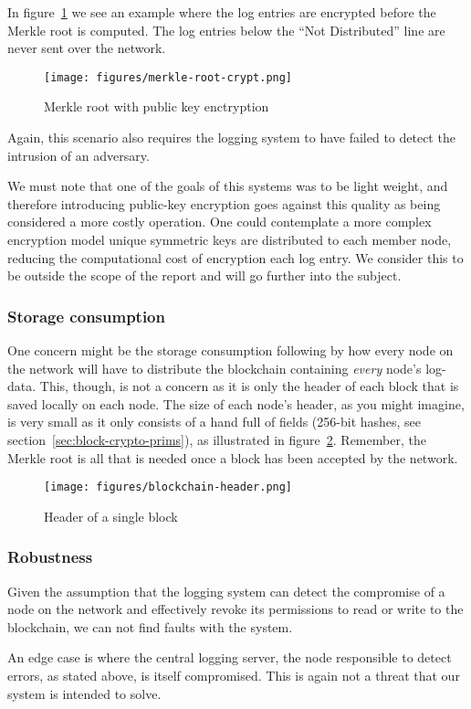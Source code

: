 In figure~\ref{fig:merkle-root-crypt} we see an example where the log
entries are encrypted before the Merkle root is computed. The log
entries below the ``Not Distributed'' line are never sent over the
network.

\begin{figure}
  \centering
  \texttt{[image: figures/merkle-root-crypt.png]}
  \caption{\label{fig:merkle-root-crypt} Merkle root with public key enctryption}
\end{figure}

Again, this scenario also requires the logging system to have failed
to detect the intrusion of an adversary.

We must note that one of the goals of this systems was to be light
weight, and therefore introducing public-key encryption goes against
this quality as being considered a more costly operation. One could
contemplate a more complex encryption model unique symmetric keys are
distributed to each member node, reducing the computational cost of
encryption each log entry. We consider this to be outside the scope of
the report and will go further into the subject.

\subsubsection{Storage consumption}
One concern might be the storage consumption following by how every
node on the network will have to distribute the blockchain containing
\textit{every} node's log-data. This, though, is not a concern as it
is only the header of each block that is saved locally on each
node. The size of each node's header, as you might imagine, is very
small as it only consists of a hand full of fields (256-bit hashes,
see section~\ref{sec:block-crypto-prims}), as illustrated in
figure~\ref{fig:blockchain-header}. Remember, the Merkle root is all
that is needed once a block has been accepted by the network.

\begin{figure}[H]
  \centering
  \texttt{[image: figures/blockchain-header.png]}
  \caption{\label{fig:blockchain-header} Header of a single block}
\end{figure}


\subsubsection{Robustness}
Given the assumption that the logging system can detect the compromise
of a node on the network and effectively revoke its permissions to
read or write to the blockchain, we can not find faults with the
system.

An edge case is where the central logging server, the node responsible
to detect errors, as stated above, is itself compromised. This is
again not a threat that our system is intended to solve.
